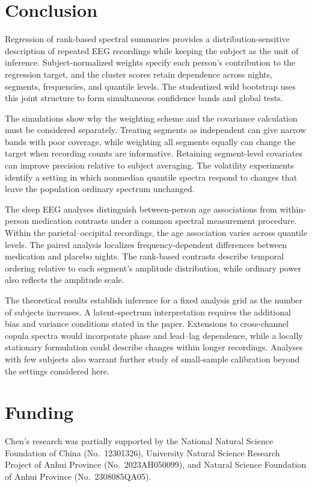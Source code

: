 \section{Conclusion}\label{sec:conclusion}
Regression of rank-based spectral summaries provides a distribution-sensitive description of repeated EEG recordings while keeping the subject as the unit of inference. Subject-normalized weights specify each person's contribution to the regression target, and the cluster scores retain dependence across nights, segments, frequencies, and quantile levels. The studentized wild bootstrap uses this joint structure to form simultaneous confidence bands and global tests.

The simulations show why the weighting scheme and the covariance calculation must be considered separately. Treating segments as independent can give narrow bands with poor coverage, while weighting all segments equally can change the target when recording counts are informative. Retaining segment-level covariates can improve precision relative to subject averaging. The volatility experiments identify a setting in which nonmedian quantile spectra respond to changes that leave the population ordinary spectrum unchanged.

The sleep EEG analyses distinguish between-person age associations from within-person medication contrasts under a common spectral measurement procedure. Within the parietal--occipital recordings, the age association varies across quantile levels. The paired analysis localizes frequency-dependent differences between medication and placebo nights. The rank-based contrasts describe temporal ordering relative to each segment's amplitude distribution, while ordinary power also reflects the amplitude scale.

The theoretical results establish inference for a fixed analysis grid as the number of subjects increases. A latent-spectrum interpretation requires the additional bias and variance conditions stated in the paper. Extensions to cross-channel copula spectra would incorporate phase and lead--lag dependence, while a locally stationary formulation could describe changes within longer recordings. Analyses with few subjects also warrant further study of small-sample calibration beyond the settings considered here.

\section*{Funding}
Chen's research was partially supported by the National Natural Science Foundation of China (No.\ 12301326), University Natural Science Research Project of Anhui Province (No.\ 2023AH050099), and Natural Science Foundation of Anhui Province (No.\ 2308085QA05).

